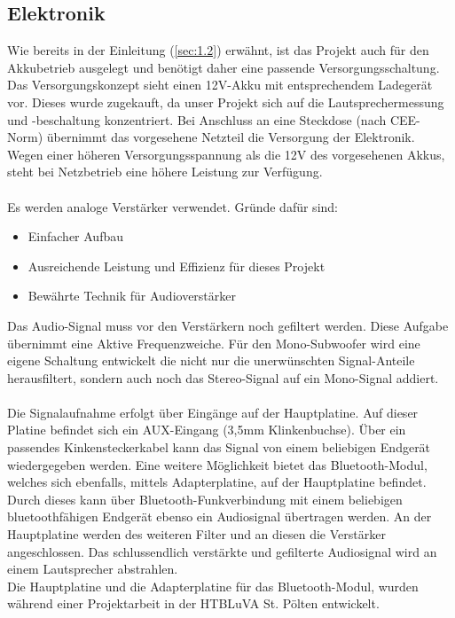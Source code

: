 \subsection{Elektronik}\label{subsec:2.1.1}
Wie bereits in der Einleitung (\ref{sec:1.2}) erwähnt, ist das Projekt auch für den Akkubetrieb ausgelegt und benötigt daher eine passende Versorgungsschaltung.
Das Versorgungskonzept sieht einen 12V-Akku mit entsprechendem Ladegerät vor.
Dieses wurde zugekauft, da unser Projekt sich auf die Lautsprechermessung und -beschaltung konzentriert.
Bei Anschluss an eine Steckdose (nach CEE-Norm) übernimmt das vorgesehene Netzteil die Versorgung der Elektronik.
Wegen einer höheren Versorgungsspannung als die 12V des vorgesehenen Akkus, steht bei Netzbetrieb eine höhere Leistung zur Verfügung. \\ \\
Es werden analoge Verstärker verwendet.
Gründe dafür sind:
\begin{itemize}
	\item Einfacher Aufbau
	\item Ausreichende Leistung und Effizienz für dieses Projekt
	\item Bewährte Technik für Audioverstärker
\end{itemize} 
Das Audio-Signal muss vor den Verstärkern noch gefiltert werden.
Diese Aufgabe übernimmt eine Aktive Frequenzweiche.
Für den Mono-Subwoofer wird eine eigene Schaltung entwickelt die nicht nur die unerwünschten Signal-Anteile herausfiltert, sondern auch noch das Stereo-Signal auf ein Mono-Signal addiert.\\ \\
Die Signalaufnahme erfolgt über Eingänge auf der Hauptplatine.
Auf dieser Platine befindet sich ein AUX-Eingang (3,5mm Klinkenbuchse).
Über ein passendes Kinkensteckerkabel kann das Signal von einem beliebigen Endgerät wiedergegeben werden.
Eine weitere Möglichkeit bietet das Bluetooth-Modul, welches sich ebenfalls, mittels Adapterplatine, auf der Hauptplatine befindet.
Durch dieses kann über Bluetooth-Funkverbindung mit einem beliebigen bluetoothfähigen Endgerät ebenso ein Audiosignal übertragen werden.
An der Hauptplatine werden des weiteren Filter und an diesen die Verstärker angeschlossen. 
Das schlussendlich verstärkte und gefilterte Audiosignal wird an einem Lautsprecher abstrahlen.\\
Die Hauptplatine und die Adapterplatine für das Bluetooth-Modul, wurden während einer Projektarbeit in der HTBLuVA St. Pölten entwickelt.

